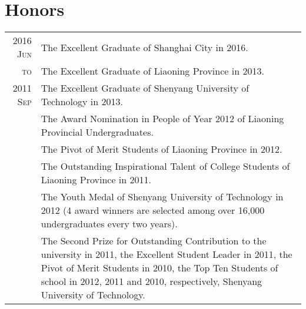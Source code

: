 \documentclass[a4paper,10pt]{article}
\begin{document}
\section{Honors}
\begin{longtable}[H]{r|p{13.5cm}}
  \textsc{2016 Jun} & The Excellent Graduate of Shanghai City in 2016. \\
  \textsc{to}& The Excellent Graduate of Liaoning Province in 2013. \\
  \textsc{2011 Sep} & The Excellent Graduate of Shenyang University of Technology in 2013. \\
                    & The Award Nomination in People of Year 2012 of Liaoning Provincial Undergraduates. \\
                    & The Pivot of Merit Students of Liaoning Province in 2012. \\
                    & The Outstanding Inspirational Talent of College Students of Liaoning Province in 2011. \\
                    & The Youth Medal of Shenyang University of Technology in 2012 (4 award winners are selected among over 16,000 undergraduates every two years). \\
                    & The {Second Prize for Outstanding Contribution} to the university in 2011, the {Excellent Student Leader} in 2011, the {Pivot of Merit Students} in 2010, the {Top Ten Students} of school in 2012, 2011 and 2010, respectively, Shenyang University of Technology.
\end{longtable}




\end{document}
